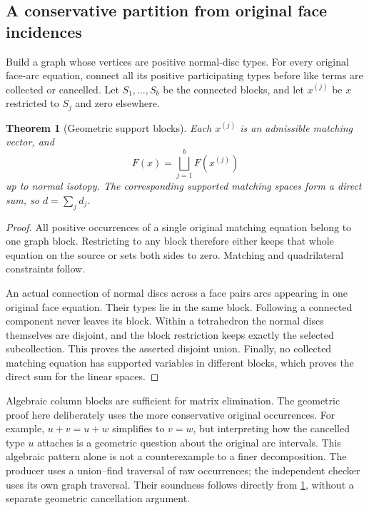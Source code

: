 \documentclass[11pt,a4paper]{article}
\newtheorem{theorem}{Theorem}[section]
\theoremstyle{definition}
\begin{document}
\subsection{A conservative partition from original face incidences}

Build a graph whose vertices are positive normal-disc types.  For every
original face-arc equation, connect all its positive participating types
before like terms are collected or cancelled.  Let $S_1,\ldots,S_b$ be the
connected blocks, and let $x^{(j)}$ be $x$ restricted to $S_j$ and zero elsewhere.

\begin{theorem}[Geometric support blocks]
\label{thm:blocks}
Each $x^{(j)}$ is an admissible matching vector, and
\[
 F(x)=\bigsqcup_{j=1}^{b}F(x^{(j)})
\]
up to normal isotopy.  The corresponding supported matching spaces form a
direct sum, so $d=\sum_j d_j$.
\end{theorem}

\begin{proof}
All positive occurrences of a single original matching equation belong to
one graph block.  Restricting to any block therefore either keeps that whole
equation on the source or sets both sides to zero.  Matching and quadrilateral
constraints follow.

An actual connection of normal discs across a face pairs arcs appearing in
one original face equation.  Their types lie in the same block.  Following
a connected component never leaves its block.  Within a tetrahedron the
normal discs themselves are disjoint, and the block restriction keeps exactly
the selected subcollection.  This proves the asserted disjoint union.  Finally,
no collected matching equation has supported variables in different blocks,
which proves the direct sum for the linear spaces.
\end{proof}

Algebraic column blocks are sufficient for matrix elimination.  The geometric
proof here deliberately uses the more conservative original occurrences.
For example, $u+v=u+w$ simplifies to $v=w$, but interpreting how the cancelled
type $u$ attaches is a geometric question about the original arc intervals.
This algebraic pattern alone is not a counterexample to a finer decomposition.
The producer uses a union--find traversal of raw occurrences; the independent
checker uses its own graph traversal.  Their soundness follows directly from
\cref{thm:blocks}, without a separate geometric cancellation argument.
\end{document}
